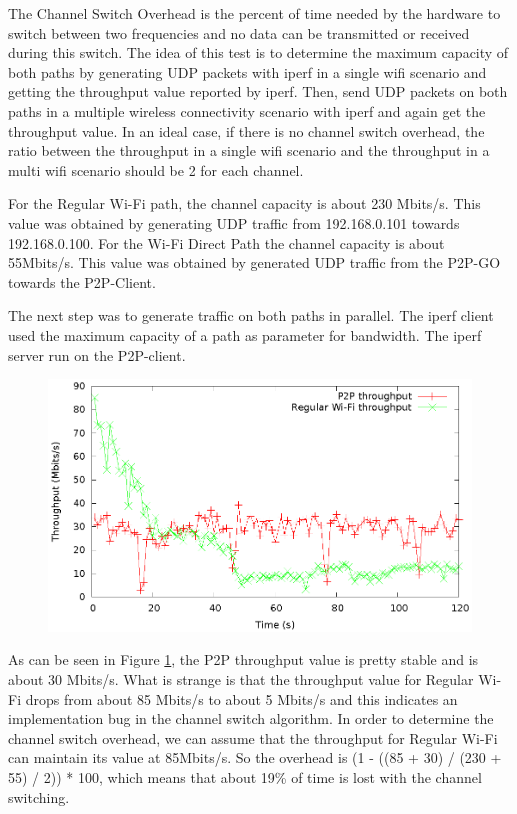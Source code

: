 The Channel Switch Overhead is the percent of time needed by the hardware to switch between two frequencies and no data can be transmitted or received during this switch. The idea of this test is to determine the maximum capacity of both paths by generating UDP packets with iperf in a single wifi scenario and getting the throughput value reported by iperf. Then, send UDP packets on both paths in a multiple wireless connectivity scenario with iperf and again get the throughput value. In an ideal case, if there is no channel switch overhead, the ratio between the throughput in a single wifi scenario and the throughput in a multi wifi scenario should be 2 for each channel.

For the Regular Wi-Fi path, the channel capacity is  about 230 Mbits/s. This value was obtained by generating UDP traffic from 192.168.0.101 towards 192.168.0.100. For the Wi-Fi Direct Path the channel capacity is about 55Mbits/s. This value was obtained by generated UDP traffic from the P2P-GO towards the P2P-Client.

The next step was to generate traffic on both paths in parallel. The iperf client used the maximum capacity of a path as parameter for bandwidth. The iperf server run on the P2P-client.

\begin{figure}[h!]
\includegraphics{src/img/throughpout.eps}
\label{img-thr}
\end{figure}

As can be seen in Figure \ref{img-thr}, the P2P throughput value is pretty stable and is about 30 Mbits/s. What is strange is that the throughput value for Regular Wi-Fi drops from about 85 Mbits/s to about 5 Mbits/s and this indicates an implementation bug in the channel switch algorithm. In order to determine the channel switch overhead, we can assume that the throughput for Regular Wi-Fi can maintain its value at 85Mbits/s. So the overhead is (1 - ((85 + 30) / (230 + 55) / 2)) * 100, which means that about 19\% of time is lost with the channel switching.


